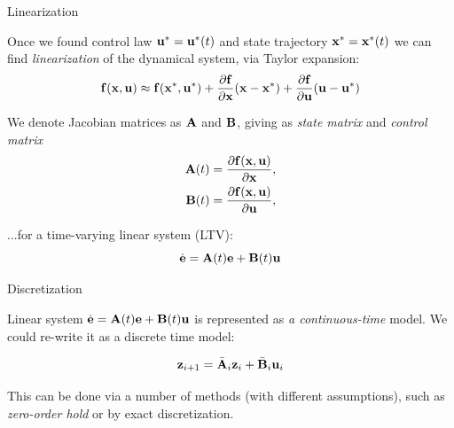 \documentclass{beamer}
\begin{document}
\begin{frame}{Linearization}
	\begin{flushleft}
		
		Once we found control law $\mathbf{u}^* = \mathbf{u}^*(t)$ and state trajectory $\mathbf{x}^* = \mathbf{x}^*(t)$ we can find \emph{linearization} of the dynamical system, via Taylor expansion:
		\begin{equation}
			\mathbf{f}(\mathbf{x}, \mathbf{u}) \approx 
			\mathbf{f}(\mathbf{x}^*, \mathbf{u}^*)
			+
			\frac{\partial \mathbf{f}}{\partial \mathbf{x}} (\mathbf{x} - \mathbf{x}^*)
			+
			\frac{\partial \mathbf{f}}{\partial \mathbf{u}} (\mathbf{u} - \mathbf{u}^*)
		\end{equation} 
		
		We denote Jacobian matrices as $\mathbf{A}$ and $\mathbf{B}$, giving as \emph{state matrix} and \emph{control matrix}
		\begin{align}
			\mathbf{A}(t) = \frac{\partial \mathbf{f}(\mathbf{x}, \mathbf{u})}{\partial \mathbf{x}}, \\
			\mathbf{B}(t) = \frac{\partial \mathbf{f}(\mathbf{x}, \mathbf{u})}{\partial \mathbf{u}},
		\end{align}
		
		...for a time-varying linear system (LTV):
		\begin{equation}
			\dot{\mathbf{e}} = \mathbf{A}(t) \mathbf{e} + \mathbf{B}(t) \mathbf{u}
		\end{equation} 
		
	\end{flushleft}
\end{frame}



\begin{frame}{Discretization}
	\begin{flushleft}
		
		Linear system $\dot{\mathbf{e}} = \mathbf{A}(t) \mathbf{e} + \mathbf{B}(t) \mathbf{u}$ is represented as \emph{a continuous-time} model. We could re-write it as a discrete time model:
		
		\begin{equation}
			\mathbf{z}_{i+1} = \bar{\mathbf{A}}_i \mathbf{z}_i + \bar{\mathbf{B}}_i \mathbf{u}_i
		\end{equation} 
		
		This can be done via a number of methods (with different assumptions), such as \emph{zero-order hold} or by exact discretization.
		
	\end{flushleft}
\end{frame}
\end{document}
